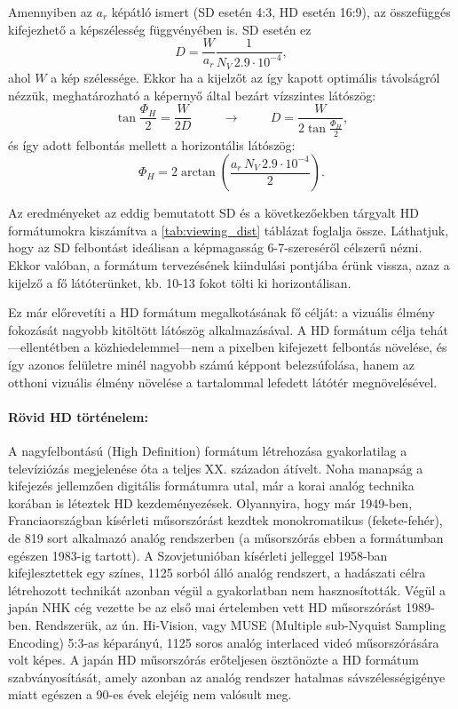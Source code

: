 Amennyiben az $a_r$ képátló ismert (SD esetén 4:3, HD esetén 16:9), az összefüggés kifejezhető a képszélesség függvényében is.
SD esetén ez
\begin{equation}
D = \frac{W}{a_r} \frac{1}{N_V \,2.9 \cdot 10^{-4}},
\end{equation}
ahol $W$ a kép szélessége.
Ekkor ha a kijelzőt az így kapott optimális távolságról nézzük, meghatározható a képernyő által bezárt vízszintes látószög:
\begin{equation}
\tan \frac{\Phi_H}{2} = \frac{W}{2 D} \hspace{1cm} \rightarrow \hspace{1cm} D = \frac{W}{2 \tan \frac{\Phi_H}{2}}, 
\end{equation}
és így adott felbontás mellett a horizontális látószög:
\begin{equation}
\Phi_H = 2\arctan \left( \frac{a_r \, N_V \, 2.9\cdot 10^{-4}}{2} \right).
\end{equation}

Az eredményeket az eddig bemutatott SD és a következőekben tárgyalt HD formátumokra kiszámítva a \ref{tab:viewing_dist} táblázat foglalja össze.
Láthatjuk, hogy az SD felbontást ideálisan a képmagasság 6-7-szereséről célszerű nézni.
Ekkor valóban, a formátum tervezésének kiindulási pontjába érünk vissza, azaz a kijelző a fő látóterünket, kb. 10-13 fokot tölti ki horizontálisan.


Ez már előrevetíti a HD formátum megalkotásának fő célját: a vizuális élmény fokozását nagyobb kitöltött látószög alkalmazásával.
A HD formátum célja tehát---ellentétben a közhiedelemmel---nem a pixelben kifejezett felbontás növelése, és így azonos felületre minél nagyobb számú képpont belezsúfolása, hanem az otthoni vizuális élmény növelése a tartalommal lefedett látótér megnövelésével.

\paragraph{Rövid HD történelem:\\}

A nagyfelbontású (High Definition) formátum létrehozása gyakorlatilag a televíziózás megjelenése óta a teljes XX. századon átívelt.
Noha manapság a kifejezés jellemzően digitális formátumra utal, már a korai analóg technika korában is léteztek HD kezdeményezések.
Olyannyira, hogy már 1949-ben, Franciaországban kísérleti műsorszórást kezdtek monokromatikus (fekete-fehér), de 819 sort alkalmazó analóg rendszerben (a műsorszórás ebben a formátumban egészen 1983-ig tartott).
A Szovjetunióban kísérleti jelleggel 1958-ban kifejlesztettek egy színes, 1125 sorból álló analóg rendszert, a hadászati célra létrehozott technikát azonban végül a gyakorlatban nem hasznosították.
Végül a japán NHK cég vezette be az első mai értelemben vett HD műsorszórást 1989-ben.
Rendszerük, az ún. Hi-Vision, vagy MUSE (Multiple sub-Nyquist Sampling Encoding) 5:3-as képarányú, 1125 soros analóg interlaced videó műsorszórására volt képes.
A japán HD műsorszórás erőteljesen ösztönözte a HD formátum szabványosítását, amely azonban az analóg rendszer hatalmas sávszélességigénye miatt egészen a 90-es évek elejéig nem valósult meg.

